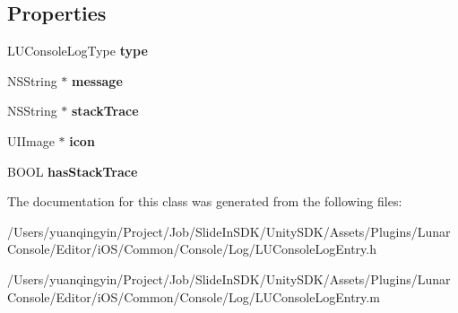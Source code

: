 \subsection*{Properties}
\begin{DoxyCompactItemize}
\item 
\mbox{\label{interface_l_u_console_log_entry_a545ae7a61e71d3644c59672f034ad415}} 
L\+U\+Console\+Log\+Type {\bfseries type}
\item 
\mbox{\label{interface_l_u_console_log_entry_a0f71d6f29a43b5167e9ccfe752c19c84}} 
N\+S\+String $\ast$ {\bfseries message}
\item 
\mbox{\label{interface_l_u_console_log_entry_a29ee0819ca62f65cf4d4fb3844c118c4}} 
N\+S\+String $\ast$ {\bfseries stack\+Trace}
\item 
\mbox{\label{interface_l_u_console_log_entry_a5eb81271d49a4c23171f75acda1a624b}} 
U\+I\+Image $\ast$ {\bfseries icon}
\item 
\mbox{\label{interface_l_u_console_log_entry_a9181e11620c347d1a7e77769fb9f222e}} 
B\+O\+OL {\bfseries has\+Stack\+Trace}
\end{DoxyCompactItemize}


The documentation for this class was generated from the following files\+:\begin{DoxyCompactItemize}
\item 
/\+Users/yuanqingyin/\+Project/\+Job/\+Slide\+In\+S\+D\+K/\+Unity\+S\+D\+K/\+Assets/\+Plugins/\+Lunar\+Console/\+Editor/i\+O\+S/\+Common/\+Console/\+Log/L\+U\+Console\+Log\+Entry.\+h\item 
/\+Users/yuanqingyin/\+Project/\+Job/\+Slide\+In\+S\+D\+K/\+Unity\+S\+D\+K/\+Assets/\+Plugins/\+Lunar\+Console/\+Editor/i\+O\+S/\+Common/\+Console/\+Log/L\+U\+Console\+Log\+Entry.\+m\end{DoxyCompactItemize}
